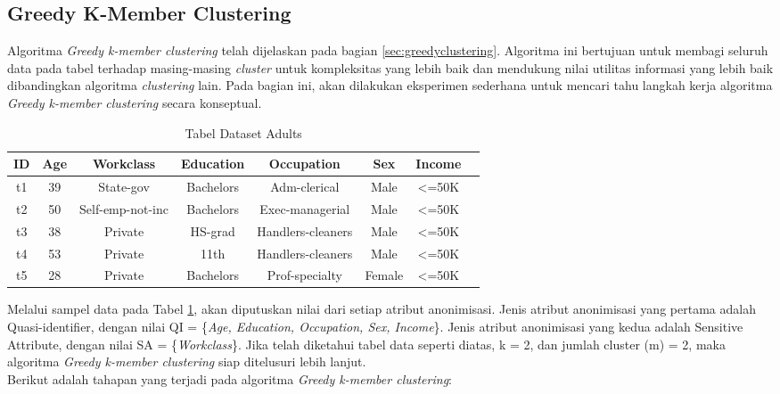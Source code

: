 \subsection{Greedy K-Member Clustering}
Algoritma \textit{Greedy k-member clustering} telah dijelaskan pada bagian \ref{sec:greedyclustering}. Algoritma ini bertujuan untuk membagi seluruh data pada tabel terhadap masing-masing \textit{cluster} untuk kompleksitas yang lebih baik dan mendukung nilai utilitas informasi yang lebih baik dibandingkan algoritma \textit{clustering} lain. Pada bagian ini, akan dilakukan eksperimen sederhana untuk mencari tahu langkah kerja algoritma \textit{Greedy k-member clustering} secara konseptual.
\begin{table}[H]
\centering
\caption{Tabel Dataset Adults}
\begin{tabular}{c c c c c c c c}
\hline 
ID & Age & Workclass & Education & Occupation & Sex & Income\\ 
\hline 
t1 & 39 & State-gov & Bachelors & Adm-clerical & Male & <=50K \\ 

t2 & 50 & Self-emp-not-inc & Bachelors & Exec-managerial & Male & <=50K  \\ 

t3 & 38 & Private & HS-grad & Handlers-cleaners & Male & <=50K  \\ 

t4 & 53 & Private & 11th & Handlers-cleaners & Male & <=50K  \\ 
 
t5 & 28 & Private & Bachelors & Prof-specialty & Female & <=50K	 \\ 
\hline 
\end{tabular} 
\label{table:adults}
\end{table}

\par Melalui sampel data pada Tabel \ref{table:adults}, akan diputuskan nilai dari setiap atribut anonimisasi. Jenis atribut anonimisasi yang pertama adalah Quasi-identifier, dengan nilai QI = \{\textit{Age, Education, Occupation, Sex, Income}\}. Jenis atribut anonimisasi yang kedua adalah Sensitive Attribute, dengan nilai SA = \{\textit{Workclass}\}. Jika telah diketahui tabel data seperti diatas, k = 2, dan jumlah cluster (m) = 2, maka algoritma \textit{Greedy k-member clustering} siap ditelusuri lebih lanjut.\\

\noindent Berikut adalah tahapan yang terjadi pada algoritma \textit{Greedy k-member clustering}:

